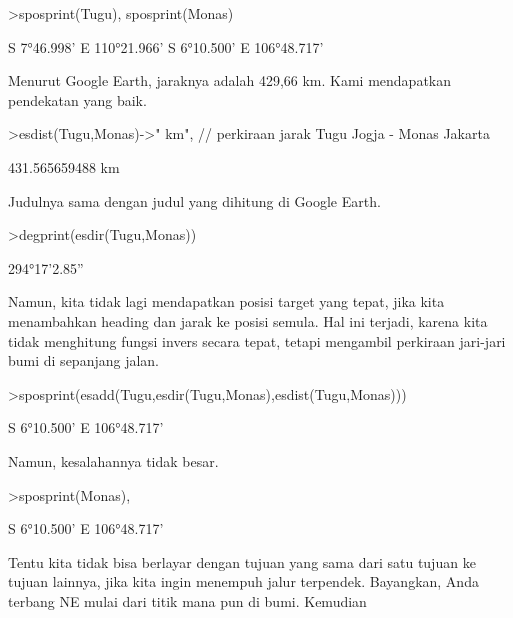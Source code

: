 \documentclass[a4paper,10pt]{article}
\begin{document}
\begin{eulernotebook}
\begin{eulercomment}
\begin{eulercomment}
\begin{eulercomment}
\begin{eulercomment}
\begin{eulercomment}
\begin{eulercomment}
\begin{eulercomment}
\begin{eulercomment}
\begin{eulercomment}
\begin{eulercomment}
\begin{eulercomment}
\begin{eulercomment}
\begin{eulercomment}
\begin{eulercomment}
\begin{eulercomment}
\begin{eulercomment}
\begin{eulerprompt}
>sposprint(Tugu), sposprint(Monas)
\end{eulerprompt}
\begin{euleroutput}
  S 7°46.998' E 110°21.966'
  S 6°10.500' E 106°48.717'
\end{euleroutput}
\begin{eulercomment}
Menurut Google Earth, jaraknya adalah 429,66 km. Kami mendapatkan
pendekatan yang baik.
\end{eulercomment}
\begin{eulerprompt}
>esdist(Tugu,Monas)->" km", // perkiraan jarak Tugu Jogja - Monas Jakarta
\end{eulerprompt}
\begin{euleroutput}
  431.565659488 km
\end{euleroutput}
\begin{eulercomment}
Judulnya sama dengan judul yang dihitung di Google Earth.
\end{eulercomment}
\begin{eulerprompt}
>degprint(esdir(Tugu,Monas))
\end{eulerprompt}
\begin{euleroutput}
  294°17'2.85''
\end{euleroutput}
\begin{eulercomment}
Namun, kita tidak lagi mendapatkan posisi target yang tepat, jika kita
menambahkan heading dan jarak ke posisi semula. Hal ini terjadi,
karena kita tidak menghitung fungsi invers secara tepat, tetapi
mengambil perkiraan jari-jari bumi di sepanjang jalan.
\end{eulercomment}
\begin{eulerprompt}
>sposprint(esadd(Tugu,esdir(Tugu,Monas),esdist(Tugu,Monas)))
\end{eulerprompt}
\begin{euleroutput}
  S 6°10.500' E 106°48.717'
\end{euleroutput}
\begin{eulercomment}
Namun, kesalahannya tidak besar.
\end{eulercomment}
\begin{eulerprompt}
>sposprint(Monas),
\end{eulerprompt}
\begin{euleroutput}
  S 6°10.500' E 106°48.717'
\end{euleroutput}
\begin{eulercomment}
Tentu kita tidak bisa berlayar dengan tujuan yang sama dari satu
tujuan ke tujuan lainnya, jika kita ingin menempuh jalur terpendek.
Bayangkan, Anda terbang NE mulai dari titik mana pun di bumi. Kemudian

\end{eulercomment}
\end{eulercomment}
\end{eulercomment}
\end{eulercomment}
\end{eulercomment}
\end{eulercomment}
\end{eulercomment}
\end{eulercomment}
\end{eulercomment}
\end{eulercomment}
\end{eulercomment}
\end{eulercomment}
\end{eulercomment}
\end{eulercomment}
\end{eulercomment}
\end{eulercomment}
\end{eulercomment}
\end{eulernotebook}
\end{document}
